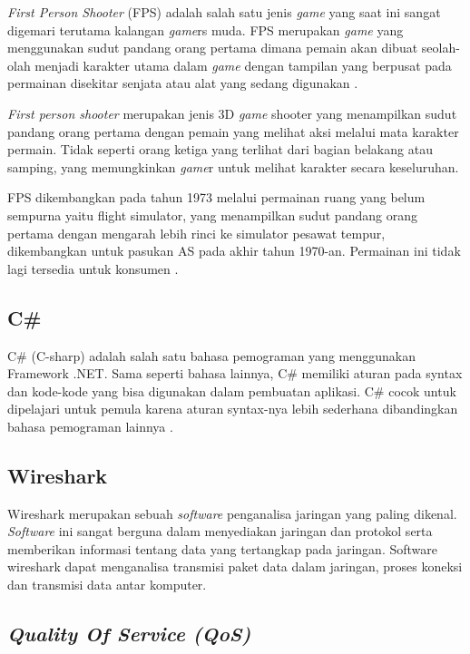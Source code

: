 \textit{First Person Shooter} (FPS) adalah salah satu jenis \textit{game} yang saat ini sangat digemari terutama kalangan \textit{game}rs muda. FPS merupakan \textit{game} yang menggunakan sudut pandang orang pertama dimana pemain akan dibuat seolah-olah menjadi karakter utama dalam \textit{game} dengan tampilan yang berpusat pada permainan disekitar senjata atau alat yang sedang digunakan \cite{fps}.

\textit{First person shooter} merupakan jenis 3D \textit{game} shooter yang menampilkan sudut pandang orang pertama dengan 
pemain yang melihat aksi melalui mata karakter permain. Tidak seperti orang ketiga yang terlihat dari bagian 
belakang atau samping, yang memungkinkan \textit{game}r untuk melihat karakter secara keseluruhan\cite{fps}.

FPS dikembangkan pada tahun 1973 melalui permainan ruang yang belum sempurna yaitu flight simulator, yang 
menampilkan sudut pandang orang pertama dengan mengarah lebih rinci ke simulator pesawat tempur, dikembangkan untuk pasukan AS pada akhir tahun 1970-an. Permainan ini tidak lagi tersedia untuk konsumen \cite{fps}.

\subsection{C\#}
\noindent

C\# (C-sharp) adalah salah satu bahasa pemograman yang menggunakan Framework .NET. Sama seperti 
bahasa lainnya, C\# memiliki aturan pada syntax dan kode-kode yang bisa digunakan dalam pembuatan aplikasi. 
C\# cocok untuk dipelajari untuk pemula karena aturan syntax-nya lebih sederhana dibandingkan bahasa 
pemograman lainnya \cite{Ansori}.

\subsection{Wireshark}
\noindent

Wireshark merupakan sebuah \textit{software} penganalisa jaringan yang paling dikenal. \textit{Software} ini 
sangat berguna dalam menyediakan jaringan dan protokol serta memberikan informasi tentang 
data yang tertangkap pada jaringan. Software wireshark dapat menganalisa transmisi paket data 
dalam jaringan, proses koneksi dan transmisi data antar komputer\cite{wireshark}.

\subsection{\textit{Quality Of Service (QoS)}}
\noindent

